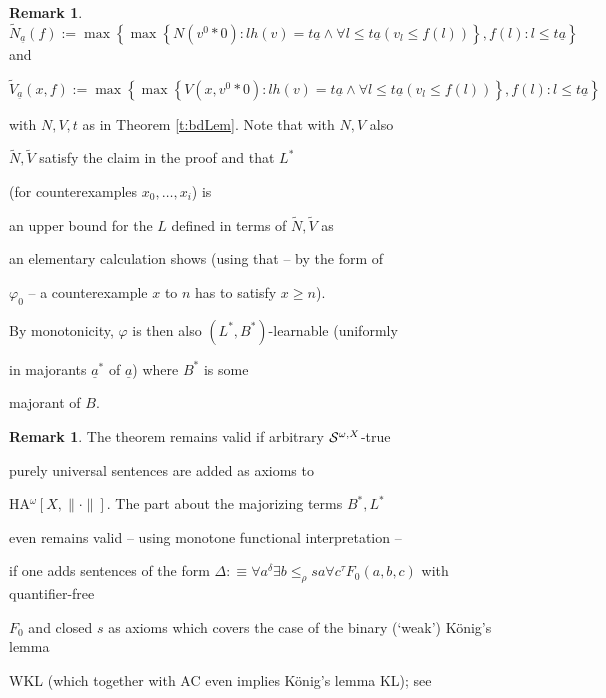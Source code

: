 \documentclass[1p]{elsarticle}
\theoremstyle{plain}
\theoremstyle{definition}
\newtheorem{rmk}[thm]{Remark}
\theoremstyle{remark}
\theoremstyle{definition}
\begin{document}
{\begin{rmk}
\[ \tilde{N}_{\underline{a}}(f):=\max\left\{ \max\left\{ 

N(v^0*0):lh(v)=t\underline{a}\wedge \forall l\le t\underline{a}(v_l\le f(l))

\right\},f(l):l\le t\underline{a}\right\}\] and 

\[ \tilde{V}_{\underline{a}}(x,f):=\max\left\{ \max\left\{ 

V(x,v^0*0):lh(v)=t\underline{a}\wedge \forall l\le t\underline{a}(v_l\le f(l))

\right\},f(l):l\le t\underline{a}\right\}\] 

with $N,V,t$ as in Theorem \ref{t:bdLem}. Note that with $N,V$ also 

$\tilde{N},\tilde{V}$ satisfy the claim in the proof and that $L^*$ 

(for counterexamples $x_0,\ldots,x_i$) is 

an upper bound for the $L$ defined in terms of $\tilde{N},\tilde{V}$ as 

an elementary calculation shows (using that -- by the form of 

$\varphi_0$ -- a counterexample $x$ to $n$ has to satisfy $x\ge n$). 

By monotonicity, $\varphi$ is then also $(L^*,B^*)$-learnable (uniformly 

in majorants $\underline{a}^*$ of $\underline{a}$) where $B^*$ is some 

majorant of $B.$ 

\end{rmk}  

\begin{rmk} The theorem remains valid if arbitrary ${\cal S}^{\omega,X }$-true 

purely universal sentences are added as axioms to 

{\rm HA$^{\omega}[X,\|\cdot\|]$}. The part about the majorizing terms $B^*,L^*$ 

even remains valid -- using monotone functional interpretation -- 

if one adds sentences of the form $\Delta:\equiv 

\forall a^{\delta}\exists b\le_{\rho} sa\forall c^{\tau} 

F_0(a,b,c)$ with quantifier-free 

$F_0$ and closed $s$ as axioms which covers the case of the binary (`weak') K\"onig's lemma 

WKL (which together with AC even implies K\"onig's lemma KL); see 


\end{rmk}}
\end{document}
